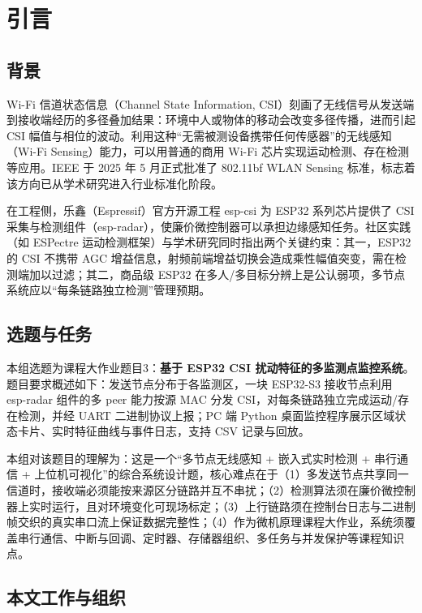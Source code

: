 \chapter{引言}

\section{背景}

Wi-Fi 信道状态信息（Channel State Information, CSI）刻画了无线信号从发送端到接收端经历的多径叠加结果：环境中人或物体的移动会改变多径传播，进而引起 CSI 幅值与相位的波动。利用这种“无需被测设备携带任何传感器”的无线感知（Wi-Fi Sensing）能力，可以用普通的商用 Wi-Fi 芯片实现运动检测、存在检测等应用\cite{ref:hernandez}。IEEE 于 2025 年 5 月正式批准了 802.11bf WLAN Sensing 标准\cite{ref:80211bf}，标志着该方向已从学术研究进入行业标准化阶段。

在工程侧，乐鑫（Espressif）官方开源工程 esp-csi 为 ESP32 系列芯片提供了 CSI 采集与检测组件（esp-radar）\cite{ref:espcsi}，使廉价微控制器可以承担边缘感知任务\cite{ref:hernandez}。社区实践（如 ESPectre 运动检测框架\cite{ref:espectre}）与学术研究同时指出两个关键约束：其一，ESP32 的 CSI 不携带 AGC 增益信息，射频前端增益切换会造成乘性幅值突变，需在检测端加以过滤\cite{ref:agc185,ref:csisim}；其二，商品级 ESP32 在多人/多目标分辨上是公认弱项，多节点系统应以“每条链路独立检测”管理预期\cite{ref:gait}。

\section{选题与任务}

本组选题为课程大作业题目3：\textbf{基于 ESP32 CSI 扰动特征的多监测点监控系统}。题目要求概述如下：发送节点分布于各监测区，一块 ESP32-S3 接收节点利用 esp-radar 组件的多 peer 能力按源 MAC 分发 CSI，对每条链路独立完成运动/存在检测，并经 UART 二进制协议上报；PC 端 Python 桌面监控程序展示区域状态卡片、实时特征曲线与事件日志，支持 CSV 记录与回放。

本组对该题目的理解为：这是一个“多节点无线感知 + 嵌入式实时检测 + 串行通信 + 上位机可视化”的综合系统设计题，核心难点在于（1）多发送节点共享同一信道时，接收端必须能按来源区分链路并互不串扰；（2）检测算法须在廉价微控制器上实时运行，且对环境变化可现场标定；（3）上行链路须在控制台日志与二进制帧交织的真实串口流上保证数据完整性；（4）作为微机原理课程大作业，系统须覆盖串行通信、中断与回调、定时器、存储器组织、多任务与并发保护等课程知识点。

\section{本文工作与组织}

